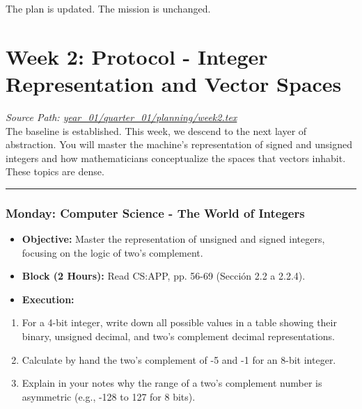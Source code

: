 \documentclass[11pt,a4paper]{report}
\begin{document}
The plan is updated. The mission is unchanged.

\newpage
\section{Week 2: Protocol - Integer Representation and Vector Spaces}
\noindent\textit{Source Path: \href{https://github.com/TEGDV/QuantitativeSystemsEngineering/blob/main/year_01/quarter_01/planning/week2.tex}{year\_01/quarter\_01/planning/week2.tex}}\\


The baseline is established. This week, we descend to the next layer of abstraction. You will master the machine's representation of signed and unsigned integers and how mathematicians conceptualize the spaces that vectors inhabit. These topics are dense.
\noindent\rule{\textwidth}{0.4pt}

\subsubsection{\textbf{Monday: Computer Science - The World of Integers}}
\begin{itemize}
  \item \textbf{Objective:} Master the representation of unsigned and signed integers, focusing on the logic of two's complement.
  \item \textbf{Block (2 Hours):} Read CS:APP, pp. 56-69 (Sección 2.2 a 2.2.4).
  \item \textbf{Execution:}
\end{itemize}
\begin{enumerate}
  \item For a 4-bit integer, write down all possible values in a table showing their binary, unsigned decimal, and two's complement decimal representations.
  \item Calculate by hand the two's complement of -5 and -1 for an 8-bit integer.
  \item Explain in your notes why the range of a two's complement number is asymmetric (e.g., -128 to 127 for 8 bits).

\end{enumerate}
\end{document}
